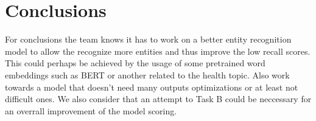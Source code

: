\documentclass[
]{ceurart}
\begin{document}
\section{Conclusions}

For conclusions the team knows it has to work on a better entity recognition model to allow the recognize more entities and thus improve the low recall scores. This could perhaps be achieved by the usage of some pretrained word embeddings such as BERT or another related to the health topic. Also work towards a model that doesn't need many outputs optimizations or at least not difficult ones. We also consider that an attempt to Task B could be neccessary for an overrall improvement of the model scoring.


\end{document}
